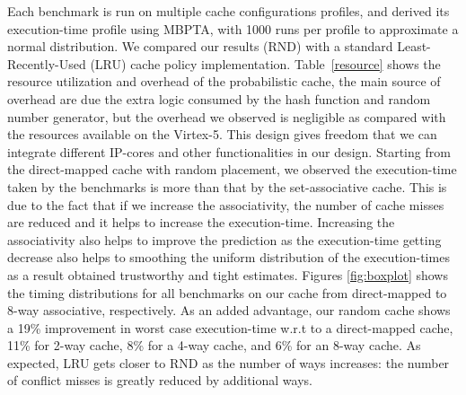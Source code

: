 Each benchmark is run on multiple cache configurations profiles, and derived its execution-time profile using MBPTA, with 1000 runs per
profile to approximate a normal  distribution.
We compared our results (RND) with a standard Least-Recently-Used (LRU)
cache policy implementation. Table~\ref{resource} shows the resource utilization and overhead of the probabilistic cache, the main source of overhead are due the extra logic consumed by the hash function and random number generator, but the overhead we observed is negligible as compared with the resources available on the Virtex-5. This design gives freedom that we can integrate different IP-cores and other functionalities in our design. Starting from the direct-mapped cache with random placement, we observed the execution-time taken by the benchmarks is more than that by the set-associative cache. This is due to the fact that if we increase the associativity, the number of cache misses are reduced and it helps to increase the execution-time. Increasing the associativity also helps to improve the prediction as the execution-time getting decrease also helps to smoothing the uniform distribution of the execution-times as a result obtained trustworthy and tight estimates. Figures \ref{fig:boxplot} shows the timing
distributions for all benchmarks on our cache from direct-mapped to
8-way associative, respectively. As an added advantage, our random
cache shows a 19\% improvement in worst case execution-time w.r.t to
a direct-mapped cache, 11\% for 2-way cache, 8\% for a 4-way
cache, and 6\% for an 8-way cache. As expected, LRU gets closer to RND
as the number of ways increases: the number of conflict misses is
greatly reduced by additional ways.


